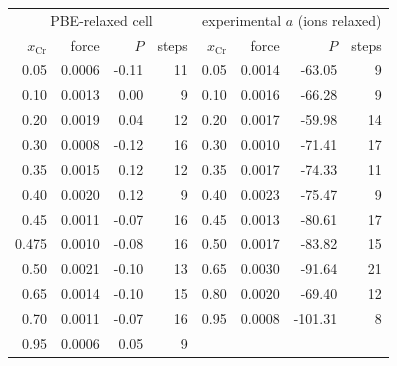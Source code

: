 {\footnotesize\setlength{\tabcolsep}{4pt}\begin{tabular}{rrrr|rrrr}
\hline
\multicolumn{4}{c|}{PBE-relaxed cell} & \multicolumn{4}{c}{experimental $a$ (ions relaxed)} \\
$x_{\mathrm{Cr}}$ & force & $P$ & steps & $x_{\mathrm{Cr}}$ & force & $P$ & steps \\
\hline
0.05 & 0.0006 & -0.11 & 11 & 0.05 & 0.0014 & -63.05 & 9 \\
0.10 & 0.0013 & 0.00 & 9 & 0.10 & 0.0016 & -66.28 & 9 \\
0.20 & 0.0019 & 0.04 & 12 & 0.20 & 0.0017 & -59.98 & 14 \\
0.30 & 0.0008 & -0.12 & 16 & 0.30 & 0.0010 & -71.41 & 17 \\
0.35 & 0.0015 & 0.12 & 12 & 0.35 & 0.0017 & -74.33 & 11 \\
0.40 & 0.0020 & 0.12 & 9 & 0.40 & 0.0023 & -75.47 & 9 \\
0.45 & 0.0011 & -0.07 & 16 & 0.45 & 0.0013 & -80.61 & 17 \\
0.475 & 0.0010 & -0.08 & 16 & 0.50 & 0.0017 & -83.82 & 15 \\
0.50 & 0.0021 & -0.10 & 13 & 0.65 & 0.0030 & -91.64 & 21 \\
0.65 & 0.0014 & -0.10 & 15 & 0.80 & 0.0020 & -69.40 & 12 \\
0.70 & 0.0011 & -0.07 & 16 & 0.95 & 0.0008 & -101.31 & 8 \\
0.95 & 0.0006 & 0.05 & 9 & & & & \\
\hline
\end{tabular}}
